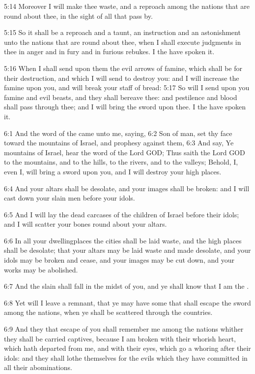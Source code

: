 5:14 Moreover I will make thee waste, and a reproach among the nations
that are round about thee, in the sight of all that pass by.

5:15 So it shall be a reproach and a taunt, an instruction and an
astonishment unto the nations that are round about thee, when I shall
execute judgments in thee in anger and in fury and in furious rebukes.
I the \LORD have spoken it.

5:16 When I shall send upon them the evil arrows of famine, which
shall be for their destruction, and which I will send to destroy you:
and I will increase the famine upon you, and will break your staff of
bread: 5:17 So will I send upon you famine and evil beasts, and they
shall bereave thee: and pestilence and blood shall pass through thee;
and I will bring the sword upon thee. I the \LORD have spoken it.

6:1 And the word of the \LORD came unto me, saying, 6:2 Son of man, set
thy face toward the mountains of Israel, and prophesy against them,
6:3 And say, Ye mountains of Israel, hear the word of the Lord GOD;
Thus saith the Lord GOD to the mountains, and to the hills, to the
rivers, and to the valleys; Behold, I, even I, will bring a sword upon
you, and I will destroy your high places.

6:4 And your altars shall be desolate, and your images shall be
broken: and I will cast down your slain men before your idols.

6:5 And I will lay the dead carcases of the children of Israel before
their idols; and I will scatter your bones round about your altars.

6:6 In all your dwellingplaces the cities shall be laid waste, and the
high places shall be desolate; that your altars may be laid waste and
made desolate, and your idols may be broken and cease, and your images
may be cut down, and your works may be abolished.

6:7 And the slain shall fall in the midst of you, and ye shall know
that I am the \LORD.

6:8 Yet will I leave a remnant, that ye may have some that shall
escape the sword among the nations, when ye shall be scattered through
the countries.

6:9 And they that escape of you shall remember me among the nations
whither they shall be carried captives, because I am broken with their
whorish heart, which hath departed from me, and with their eyes, which
go a whoring after their idols: and they shall lothe themselves for
the evils which they have committed in all their abominations.

